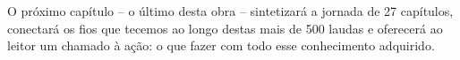 
O próximo capítulo -- o último desta obra -- sintetizará a jornada de 27
capítulos, conectará os fios que tecemos ao longo destas mais de 500 laudas e
oferecerá ao leitor um chamado à ação: o que fazer com todo esse conhecimento
adquirido.

\endinput
